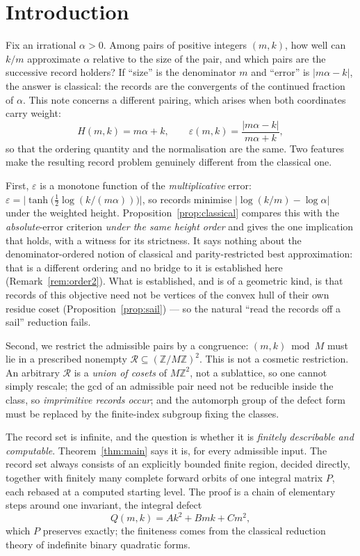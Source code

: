 \documentclass[11pt]{article}
\theoremstyle{definition}
\theoremstyle{remark}
\newcommand{\Z}{\mathbb{Z}}
\begin{document}
\section{Introduction}\label{sec:intro}

Fix an irrational $\alpha>0$. Among pairs of positive integers $(m,k)$, how well can $k/m$
approximate $\alpha$ relative to the size of the pair, and which pairs are the successive
record holders? If ``size'' is the denominator $m$ and ``error'' is $|m\alpha-k|$, the answer is
classical: the records are the convergents of the continued fraction of $\alpha$. This note
concerns a different pairing, which arises when both coordinates carry weight:
\[
H(m,k)=m\alpha+k,\qquad
\varepsilon(m,k)=\frac{|m\alpha-k|}{m\alpha+k},
\]
so that the ordering quantity and the normalisation are the same. Two features make the
resulting record problem genuinely different from the classical one.

First, $\varepsilon$ is a monotone function of the \emph{multiplicative} error:
$\varepsilon=\bigl|\tanh\bigl(\tfrac12\log(k/(m\alpha))\bigr)\bigr|$, so records minimise
$|\log(k/m)-\log\alpha|$ under the weighted height. Proposition~\ref{prop:classical} compares
this with the \emph{absolute}-error criterion \emph{under the same height order} and gives the
one implication that holds, with a witness for its strictness. It says nothing about the
denominator-ordered notion of classical and parity-restricted best approximation: that is a
different ordering and no bridge to it is established here (Remark~\ref{rem:order2}). What is
established, and is of a geometric kind, is that records of this objective need not be
vertices of the convex hull of their own residue coset
(Proposition~\ref{prop:sail}) --- so the natural ``read the records off a sail'' reduction
fails.

Second, we restrict the admissible pairs by a congruence: $(m,k)\bmod M$ must lie in a
prescribed nonempty $\mathcal R\subseteq(\Z/M\Z)^2$. This is not a cosmetic restriction. An
arbitrary $\mathcal R$ is a \emph{union of cosets} of $M\Z^2$, not a sublattice, so one cannot
simply rescale; the gcd of an admissible pair need not be reducible inside the class, so
\emph{imprimitive records occur}; and the automorph group of the defect form must be replaced
by the finite-index subgroup fixing the classes.

The record set is infinite, and the question is whether it is \emph{finitely describable and
computable}. Theorem~\ref{thm:main} says it is, for every admissible input. The record set
always consists of an explicitly bounded finite region, decided directly, together with
finitely many complete forward orbits of one integral matrix $P$, each rebased at a computed
starting level. The proof is a chain of elementary steps around one invariant, the integral
defect
\[
Q(m,k)=Ak^2+Bmk+Cm^2,
\]
which $P$ preserves exactly; the finiteness comes from the classical reduction theory of
indefinite binary quadratic forms.
\end{document}
